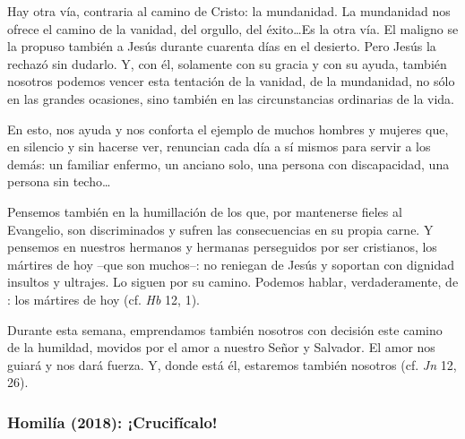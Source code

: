 \begin{body}
Hay otra vía, contraria al camino de Cristo: la mundanidad. La mundanidad nos ofrece el camino de la vanidad, del orgullo, del éxito\ldots Es la otra vía. El maligno se la propuso también a Jesús durante cuarenta días en el desierto. Pero Jesús la rechazó sin dudarlo. Y, con él, solamente con su gracia y con su ayuda, también nosotros podemos vencer esta tentación de la vanidad, de la mundanidad, no sólo en las grandes ocasiones, sino también en las circunstancias ordinarias de la vida.

En esto, nos ayuda y nos conforta el ejemplo de muchos hombres y mujeres que, en silencio y sin hacerse ver, renuncian cada día a sí mismos para servir a los demás: un familiar enfermo, un anciano solo, una persona con discapacidad, una persona sin techo\ldots

Pensemos también en la humillación de los que, por mantenerse fieles al Evangelio, son discriminados y sufren las consecuencias en su propia carne. Y pensemos en nuestros hermanos y hermanas perseguidos por ser cristianos, los mártires de hoy –que son muchos–: no reniegan de Jesús y soportan con dignidad insultos y ultrajes. Lo siguen por su camino. Podemos hablar, verdaderamente, de : los mártires de hoy (cf. \textit{Hb} 12, 1).

Durante esta semana, emprendamos también nosotros con decisión este camino de la humildad, movidos por el amor a nuestro Señor y Salvador. El amor nos guiará y nos dará fuerza. Y, donde está él, estaremos también nosotros (cf. \textit{Jn} 12, 26).
\end{body}

\label{b2-04-01-2015H}
\newpage

\subsubsection{Homilía (2018): ¡Crucifícalo!}


